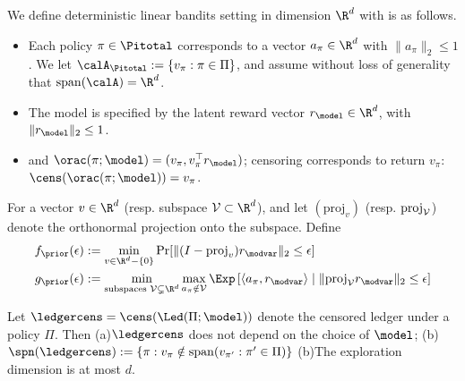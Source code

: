 \begin{setting} We define deterministic linear bandits setting in dimension $\R^d$ with is as follows. 
\begin{itemize}
	\item Each policy $\pi \in \Pitotal$ corresponds to a vector $a_{\pi} \in \R^d$ with $\|a_{\pi}\|_2 \le 1$. We let $\calA_{\Pitotal} := \{v_{\pi}: \pi \in \Pi\}$, and assume without loss of generality that $\vecspan(\calA) = \R^d$.
	\item The model is specified by the latent reward vector $r_{\model} \in \rd$, with $\|r_{\model}\|_{2} \le 1$. 
	\item   and $\orac(\pi;\model) = (v_{\pi},v_{\pi}^\top r_{\model})$; censoring corresponds to return $v_{\pi}$: $\cens(\orac(\pi;\model)) = v_{\pi}$. 
	\end{itemize}
\end{setting}
\newcommand{\projection}{\mathrm{proj}}
\begin{condition}\label{cond:linear} For a vector $v \in \R^d$ (resp. subspace $\calV \subset \R^d$), and let $(\projection_{v})$ (resp. $\projection_{\calV}$) denote the orthonormal projection onto the subspace. Define
\begin{align*}
\fprior(\epsilon) &:= \min_{v \in \rd - \{0\}} \Pr[\|(I-\projection_{v})r_{\modvar}\|_2 \le \epsilon] \\
\gprior(\epsilon) &:= \min_{\text{subspaces } \calV \subsetneq \rd} \max_{a_{\pi} \notin \calV} \Exp\left[\langle a_{\pi}, r_{\modvar} \rangle \mid \|\projection_{\calV} r_{\modvar}\|_2 \le \epsilon\right]
\end{align*}
\end{condition}




\begin{lemma}Let $\ledgercens = \cens(\Led(\Pi;\model))$ denote the censored ledger under a policy $\Pi$. Then (a)$\ledgercens$ does not depend on the choice of $\model$; (b) $\spn(\ledgercens) := \{\pi:v_{\pi} \notin \vecspan(v_{\pi'}: \pi' \in \Pi)\}$ (b)The exploration dimension is at most $d$.
\end{lemma}


\newcommand{\calZbar}{\overline{\calZ}}
